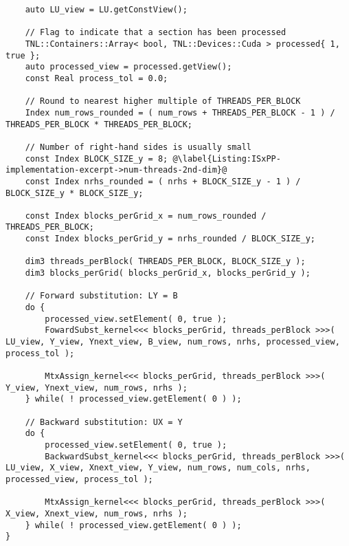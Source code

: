 \begin{lstlisting}
	auto LU_view = LU.getConstView();
	
	// Flag to indicate that a section has been processed
	TNL::Containers::Array< bool, TNL::Devices::Cuda > processed{ 1, true };
	auto processed_view = processed.getView();
	const Real process_tol = 0.0;
	
	// Round to nearest higher multiple of THREADS_PER_BLOCK
	Index num_rows_rounded = ( num_rows + THREADS_PER_BLOCK - 1 ) / THREADS_PER_BLOCK * THREADS_PER_BLOCK;
	
	// Number of right-hand sides is usually small
	const Index BLOCK_SIZE_y = 8; @\label{Listing:ISxPP-implementation-excerpt->num-threads-2nd-dim}@
	const Index nrhs_rounded = ( nrhs + BLOCK_SIZE_y - 1 ) / BLOCK_SIZE_y * BLOCK_SIZE_y;
	
	const Index blocks_perGrid_x = num_rows_rounded / THREADS_PER_BLOCK;
	const Index blocks_perGrid_y = nrhs_rounded / BLOCK_SIZE_y;
	
	dim3 threads_perBlock( THREADS_PER_BLOCK, BLOCK_SIZE_y );
	dim3 blocks_perGrid( blocks_perGrid_x, blocks_perGrid_y );
	
	// Forward substitution: LY = B
	do {
		processed_view.setElement( 0, true );
		FowardSubst_kernel<<< blocks_perGrid, threads_perBlock >>>( LU_view, Y_view, Ynext_view, B_view, num_rows, nrhs, processed_view, process_tol );
		
		MtxAssign_kernel<<< blocks_perGrid, threads_perBlock >>>( Y_view, Ynext_view, num_rows, nrhs );
	} while( ! processed_view.getElement( 0 ) );
	
	// Backward substitution: UX = Y
	do {
		processed_view.setElement( 0, true );
		BackwardSubst_kernel<<< blocks_perGrid, threads_perBlock >>>( LU_view, X_view, Xnext_view, Y_view, num_rows, num_cols, nrhs, processed_view, process_tol );

		MtxAssign_kernel<<< blocks_perGrid, threads_perBlock >>>( X_view, Xnext_view, num_rows, nrhs );
	} while( ! processed_view.getElement( 0 ) );
}
\end{lstlisting}

